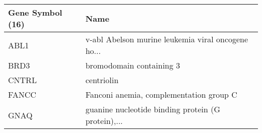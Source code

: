 \begin{tabular}{ll}
\toprule
Gene Symbol (16) &                                               Name \\
\midrule
            ABL1 & v-abl Abelson murine leukemia viral oncogene ho... \\
            BRD3 &                           bromodomain containing 3 \\
           CNTRL &                                         centriolin \\
           FANCC &            Fanconi anemia, complementation group C \\
            GNAQ & guanine nucleotide binding protein (G protein),... \\
\bottomrule
\end{tabular}
